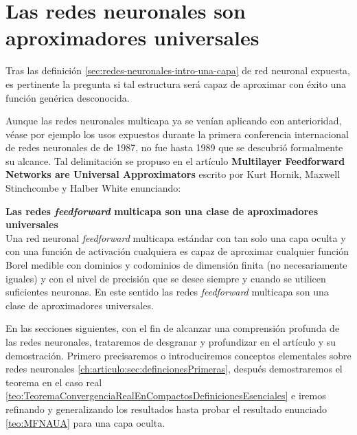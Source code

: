 %
\section{Las redes neuronales son aproximadores universales}  

Tras las definición \ref{sec:redes-neuronales-intro-una-capa} de red neuronal expuesta,
es pertinente la pregunta si tal estructura será 
capaz de aproximar con éxito una función genérica desconocida.   

Aunque las redes neuronales multicapa ya se venían aplicando con anterioridad, 
véase por ejemplo los usos expuestos durante la primera conferencia
internacional de redes neuronales de \cite{4307059} de 1987, 
no fue hasta 1989 que se descubrió formalmente su alcance.
 Tal delimitación se propuso en el artículo 
\textbf{Multilayer Feedforward Networks are Universal Approximators} \cite{HORNIK1989359}
 escrito por Kurt Hornik, Maxwell Stinchcombe y Halber White enunciando: 

\begin{teorema}\textbf{Las redes \textit{feedforward} multicapa son una clase de aproximadores universales } \label{teo:MFNAUA}
    \\
    Una red neuronal \textit{feedforward} multicapa estándar con tan solo una capa oculta y con una función de activación cualquiera es capaz de aproximar cualquier 
    función Borel medible  con dominios y codominios de dimensión finita (no necesariamente iguales) y con el nivel de precisión que se desee siempre y cuando 
    se utilicen suficientes neuronas. En este sentido las redes \textit{feedforward} multicapa son una clase de aproximadores universales.

\end{teorema}

En las secciones siguientes, con el fin de alcanzar una
 comprensión profunda de las redes neuronales,
trataremos de desgranar y profundizar en el artículo y su 
demostración. Primero precisaremos o introduciremos conceptos elementales 
sobre redes neuronales \ref{ch:articulo:sec:defincionesPrimeras}, después 
demostraremos el teorema en el caso real 
\ref{teo:TeoremaConvergenciaRealEnCompactosDefinicionesEsenciales} e iremos refinando y generalizando los resultados hasta probar
el resultado enunciado \ref{teo:MFNAUA} para una capa oculta.

